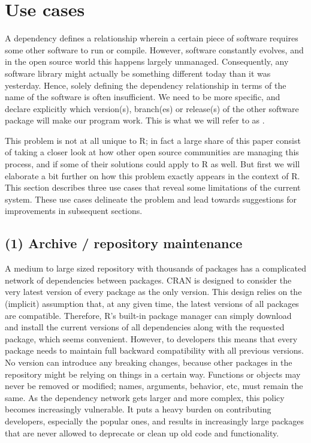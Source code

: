 \section{Use cases}

A dependency defines a relationship wherein a certain piece of software requires
some other software to run or compile. However, software constantly evolves, and in
the open source world this happens largely unmanaged. Consequently, any software
library might actually be something different today than it was yesterday.
Hence, solely defining the dependency relationship in terms of the name of the
software is often insufficient. We need to be more specific, and declare
explicitly which version(s), branch(es) or release(s) of the other software
package will make our program work. This is what we will refer to as
.

This problem is not at all unique to R; in fact a large share of this paper
consist of taking a closer look at how other open source communities are
managing this process, and if some of their solutions could apply to R as
well. But first we will elaborate a bit further on how this problem exactly
appears in the context of R. This section describes three use cases that
reveal some limitations of the current system. These use cases delineate
the problem and lead towards suggestions for improvements in subsequent sections.

\subsection{(1) Archive / repository maintenance}

A medium to large sized repository with thousands of packages has a complicated
network of dependencies between packages. CRAN is designed to consider the very
latest version of every package as the only  version. This design
relies on the (implicit) assumption that, at any given time, the latest versions
of all packages are compatible. Therefore, R's built-in package manager can simply
download and install the current versions of all dependencies along with the
requested package, which seems convenient. However, to developers this means
that every package   needs to maintain full backward compatibility
with all previous versions. No version can introduce any breaking changes, because
other packages in the repository might be relying on things in a certain way.
Functions or objects may never be removed or modified; names, arguments, behavior,
etc, must remain the same. As the dependency network gets larger and more complex,
this policy becomes increasingly vulnerable. It puts a heavy burden on
contributing developers, especially the popular ones, and results in
increasingly large packages that are never allowed to deprecate or clean up
old code and functionality.

